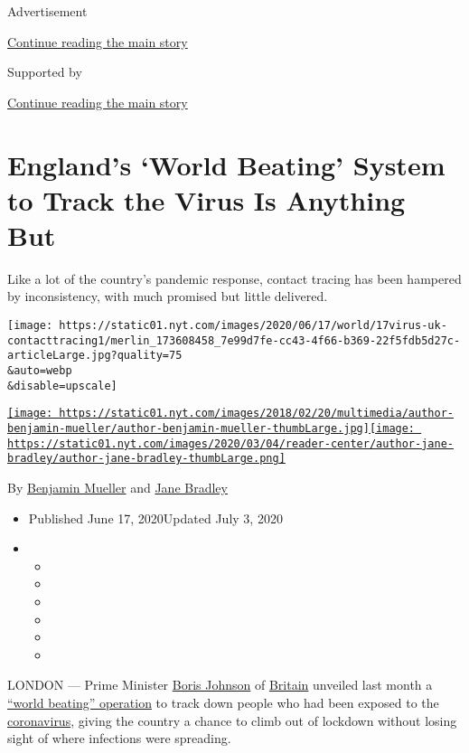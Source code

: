 Advertisement

\protect\hyperlink{after-top}{Continue reading the main story}

Supported by

\protect\hyperlink{after-sponsor}{Continue reading the main story}

\hypertarget{englands-world-beating-system-to-track-the-virus-is-anything-but}{%
\section{England's `World Beating' System to Track the Virus Is Anything
But}\label{englands-world-beating-system-to-track-the-virus-is-anything-but}}

Like a lot of the country's pandemic response, contact tracing has been
hampered by inconsistency, with much promised but little delivered.

\texttt{[image: https://static01.nyt.com/images/2020/06/17/world/17virus-uk-contacttracing1/merlin\_173608458\_7e99d7fe-cc43-4f66-b369-22f5fdb5d27c-articleLarge.jpg?quality=75\\\&auto=webp\\\&disable=upscale]}

\href{https://www.nytimes.com/by/benjamin-mueller}{\texttt{[image: https://static01.nyt.com/images/2018/02/20/multimedia/author-benjamin-mueller/author-benjamin-mueller-thumbLarge.jpg]}}\href{https://www.nytimes.com/by/jane-bradley}{\texttt{[image: https://static01.nyt.com/images/2020/03/04/reader-center/author-jane-bradley/author-jane-bradley-thumbLarge.png]}}

By \href{https://www.nytimes.com/by/benjamin-mueller}{Benjamin Mueller}
and \href{https://www.nytimes.com/by/jane-bradley}{Jane Bradley}

\begin{itemize}
\item
  Published June 17, 2020Updated July 3, 2020
\item
  \begin{itemize}
  \item
  \item
  \item
  \item
  \item
  \item
  \end{itemize}
\end{itemize}

LONDON --- Prime Minister
\href{https://www.nytimes.com/2020/06/23/world/europe/uk-coronavirus-reopening.html}{Boris
Johnson} of
\href{https://www.nytimes.com/2020/06/23/world/europe/uk-coronavirus-reopening.html}{Britain}
unveiled last month a
\href{https://www.youtube.com/watch?v=VdlIVAwWmB8}{``world beating''
operation} to track down people who had been exposed to the
\href{https://www.nytimes.com/2020/06/23/world/europe/uk-coronavirus-reopening.html}{coronavirus},
giving the country a chance to climb out of lockdown without losing
sight of where infections were spreading.

